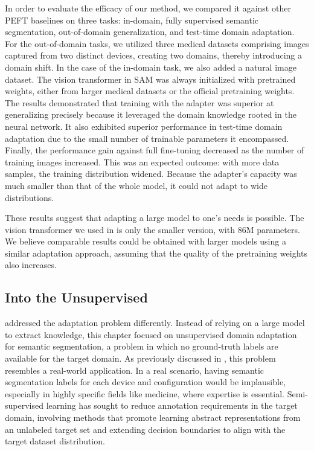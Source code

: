 In order to evaluate the efficacy of our method, we compared it against other PEFT baselines on three tasks: in-domain, fully supervised semantic segmentation, out-of-domain generalization, and test-time domain adaptation. For the out-of-domain tasks, we utilized three medical datasets comprising images captured from two distinct devices, creating two domains, thereby introducing a domain shift. In the case of the in-domain task, we also added a natural image dataset. The vision transformer in SAM was always initialized with pretrained weights, either from larger medical datasets or the official pretraining weights. The results demonstrated that training with the adapter was superior at generalizing precisely because it leveraged the domain knowledge rooted in the neural network. It also exhibited superior performance in test-time domain adaptation due to the small number of trainable parameters it encompassed. Finally, the performance gain against full fine-tuning decreased as the number of training images increased. This was an expected outcome: with more data samples, the training distribution widened. Because the adapter's capacity was much smaller than that of the whole model, it could not adapt to wide distributions.

These results suggest that adapting a large model to one's needs is possible. The vision transformer we used in  is only the smaller version, with 86M parameters. We believe comparable results could be obtained with larger models using a similar adaptation approach, assuming that the quality of the pretraining weights also increases. 

\subsection{Into the Unsupervised}
 addressed the adaptation problem differently. Instead of relying on a large model to extract knowledge, this chapter focused on unsupervised domain adaptation for semantic segmentation, a problem in which no ground-truth labels are available for the target domain. As previously discussed in , this problem resembles a real-world application. In a real scenario, having semantic segmentation labels for each device and configuration would be implausible, especially in highly specific fields like medicine, where expertise is essential. Semi-supervised learning has sought to reduce annotation requirements in the target domain, involving methods that promote learning abstract representations from an unlabeled target set and extending decision boundaries to align with the target dataset distribution.

